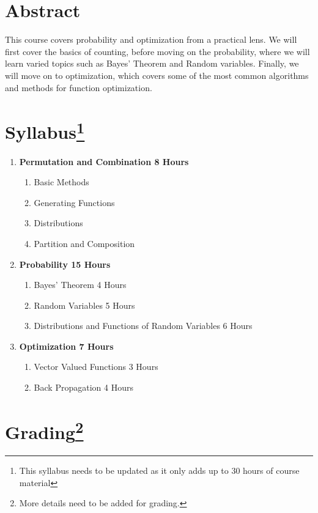 \section*{Abstract}

This course covers probability and optimization from a practical lens. We will first cover the basics of counting, before moving on the probability, where we will learn varied topics such as Bayes' Theorem and Random variables. Finally, we will move on to optimization, which covers some of the most common algorithms and methods for function optimization.

\section*{Syllabus\footnote{This syllabus needs to be updated as it only adds up to 30 hours of course material}} 

\begin{enumerate} 
    \item \textbf{Permutation and Combination \hfill 8 Hours} 
    \begin{enumerate}
        \item Basic Methods
        \item Generating Functions
        \item Distributions
        \item Partition and Composition
    \end{enumerate}
    \item \textbf{Probability \hfill 15 Hours}
    \begin{enumerate}
        \item Bayes' Theorem \hfill 4 Hours
        \item Random Variables \hfill 5 Hours
        \item Distributions and Functions of Random Variables \hfill 6 Hours
    \end{enumerate}
    \item \textbf{Optimization \hfill 7 Hours }
    \begin{enumerate}
        \item Vector Valued Functions \hfill 3 Hours
        \item Back Propagation \hfill 4 Hours
    \end{enumerate}
\end{enumerate}

\section*{Grading\footnote{More details need to be added for grading.}}

